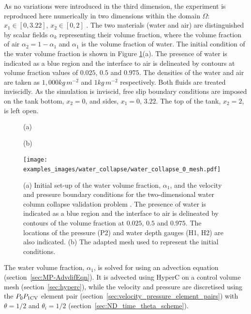 As no variations were introduced in the third dimension, the experiment is reproduced here numerically in two dimensions within the domain $\Omega$: $x_1 \in [0,3.22]$, $x_2 \in [0,2]$ \citep{lee_numerical_2002, colagrossi_numerical_2003, park_volume-of-fluid_2009}.  The two materials (water and air) are distinguished by scalar fields $\alpha_k$ representing their volume fraction, where the volume fraction of air $\alpha_2 = 1-\alpha_1$ and $\alpha_1$ is the volume fraction of water. The initial condition of the water volume fraction is shown in Figure \ref{fig:zhouinitial}(a).  The presence of water is indicated as a blue region and the interface to air is delineated by contours at volume fraction values of $0.025$, $0.5$ and $0.975$.  The densities of the water and air are taken as $ 1,000kg\,m^{-2}$ and $1kg\,m^{-2}$ respectively.  Both fluids are treated inviscidly. As the simulation is inviscid, free slip boundary conditions are imposed on the tank bottom, $x_2=0$, and sides, $x_1=0,\,3.22$.  The top of 
the tank, $x_2=2$, is left open.

\begin{figure}[tbp]
\hspace{1cm}(a)
\begin{center}
\hspace{0.4cm}
\end{center}
\hspace{1cm}(b)
\begin{center}
\texttt{[image: examples\_images/water\_collapse/water\_collapse\_0\_mesh.pdf]}
\end{center}
\caption{(a) Initial set-up of the water volume fraction, $\alpha_1$, and the velocity and pressure boundary conditions for the two-dimensional water column collapse validation problem \citep{zhou_nonlinear_1999}. The presence of water is indicated as a blue region and the interface to air is delineated by contours of the volume fraction at $0.025$, $0.5$ and $0.975$.  The locations of the pressure (P2) and water depth gauges (H1, H2) are also indicated. (b) The adapted mesh used to represent the initial conditions.}
\label{fig:zhouinitial}
\end{figure}

The water volume fraction, $\alpha_1$, is solved for using an advection equation (section~\ref{sec:MP-AdvdifEqn}).  It is advected
using HyperC on a control volume mesh (section~\ref{sec:hyperc}), while the velocity and pressure are discretised using the
$P_0P_{1\mathrm{CV}}$ element pair (section~\ref{sec:velocity_pressure_element_pairs}) with $\theta=1/2$ and $\theta_i=1/2$ (section~\ref{sec:ND_time_theta_scheme}).  

